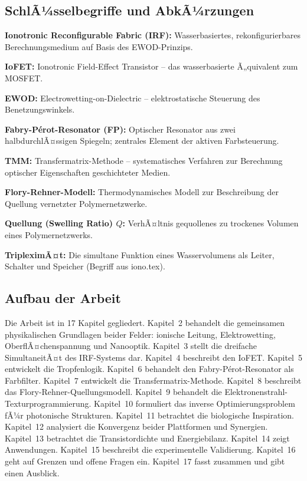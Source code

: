 ﻿\documentclass[a4paper,12pt]{scrreprt}
\theoremstyle{definition}
\begin{document}
\subsection{SchlÃ¼sselbegriffe und AbkÃ¼rzungen}

\textbf{Ionotronic Reconfigurable Fabric (IRF):} Wasserbasiertes,
rekonfigurierbares Berechnungsmedium auf Basis des EWOD-Prinzips.

\textbf{IoFET:} Ionotronic Field-Effect Transistor -- das wasserbasierte
Ã„quivalent zum MOSFET.

\textbf{EWOD:} Electrowetting-on-Dielectric -- elektrostatische Steuerung
des Benetzungswinkels.

\textbf{Fabry-P{\'e}rot-Resonator (FP):} Optischer Resonator aus zwei
halbdurchlÃ¤ssigen Spiegeln; zentrales Element der aktiven Farbsteuerung.

\textbf{TMM:} Transfermatrix-Methode -- systematisches Verfahren zur
Berechnung optischer Eigenschaften geschichteter Medien.

\textbf{Flory-Rehner-Modell:} Thermodynamisches Modell zur Beschreibung
der Quellung vernetzter Polymernetzwerke.

\textbf{Quellung (Swelling Ratio) $Q$:} VerhÃ¤ltnis gequollenes zu
trockenes Volumen eines Polymernetzwerks.

\textbf{TripleximÃ¤t:} Die simultane Funktion eines Wasservolumens als
Leiter, Schalter und Speicher (Begriff aus iono.tex).

\subsection{Aufbau der Arbeit}

Die Arbeit ist in 17 Kapitel gegliedert. Kapitel~2 behandelt
die gemeinsamen physikalischen Grundlagen beider Felder: ionische Leitung,
Elektrowetting, OberflÃ¤chenspannung und Nanooptik. Kapitel~3 stellt die
dreifache SimultaneitÃ¤t des IRF-Systems dar. Kapitel~4 beschreibt den IoFET.
Kapitel~5 entwickelt die Tropfenlogik. Kapitel~6 behandelt den
Fabry-P{\'e}rot-Resonator als Farbfilter. Kapitel~7 entwickelt die
Transfermatrix-Methode. Kapitel~8 beschreibt das Flory-Rehner-Quellungsmodell.
Kapitel~9 behandelt die Elektronenstrahl-Texturprogrammierung. Kapitel~10
formuliert das inverse Optimierungsproblem fÃ¼r photonische Strukturen. Kapitel~11 betrachtet die biologische Inspiration. Kapitel~12 analysiert die Konvergenz beider Plattformen und Synergien.
Kapitel~13 betrachtet die Transistordichte und Energiebilanz. Kapitel~14 zeigt Anwendungen. Kapitel~15 beschreibt die experimentelle Validierung. Kapitel~16 geht auf Grenzen und offene Fragen ein. Kapitel~17 fasst zusammen und gibt einen Ausblick.
\end{document}
